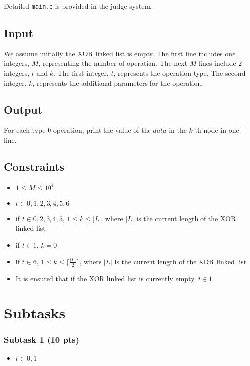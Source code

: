 Detailed \texttt{main.c} is provided in the judge system.

\subsection{Input}\label{input}

We assume initially the XOR linked list is empty. The first line includes one integers, $M$, representing the number of operation. The next $M$ lines include $2$ integers, $t$ and $k$. The first integer, $t$, represents the operation type. The second integer, $k$, represents the additional parameters for the operation.

\subsection{Output}\label{output}

For each type $0$ operation, print the value of the $data$ in the $k$-th node in one line.

\subsection{Constraints}\label{constraint}

\begin{itemize}
    \item $1\leq M\leq 10^4$
    \item $t\in 0, 1, 2, 3, 4, 5, 6$
    \item if $t\in 0, 2, 3, 4, 5$, $1\leq k\leq |L|$, where $|L|$ is the current length of the XOR linked list
    \item if $t\in 1$, $k=0$
    \item if $t\in 6$, $1\leq k\leq \lceil{\frac{|L|}{2}}\rceil$, where $|L|$ is the current length of the XOR linked list
    \item It is ensured that if the XOR linked list is currently empty, $t\in 1$
\end{itemize}

\section*{Subtasks}
\subsubsection{Subtask 1 (10 pts)}\label{subtask-1}
\begin{itemize}
\item $t\in 0, 1$
\end{itemize}

